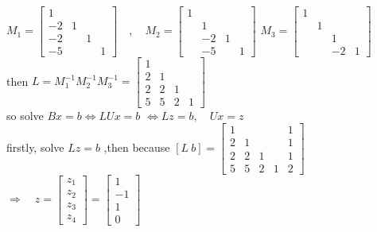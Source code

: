 \documentclass[english,onecolumn]{IEEEtran}
\begin{document}
\begin{enumerate}
\\$M_{1}=\left[\begin{array}{cccc}1 & & &\\ -2 & 1 && \\ -2 & & 1 & \\ -5 & & & 1\end{array}\right] \quad, \quad M_{2}=\left[\begin{array}{cccc}1 &&&\\ & 1&& \\ &-2 & 1& \\& -5 && 1\end{array}\right]$
$M_{3}=\left[\begin{array}{llll}1 & & &\\ & 1 & & \\ & & 1 & \\& & -2 & 1\end{array}\right]$
\\then $L=M_{1}^{-1} M_{2}^{-1} M_{3}^{-1}=\left[\begin{array}{llll}1 & & & \\ 2 & 1 & \\ 2 & 2 & 1 \\ 5 & 5 & 2 & 1\end{array}\right]$
\\so solve $B x=b \Leftrightarrow L U x=b$
$\Leftrightarrow L z=b, \quad U x=z$
\\firstly, solve $L z=b$ ,then because $[L\  b]=\left[\begin{array}{llll|l}1 & & & & 1 \\ 2 & 1 & & & 1 \\ 2 & 2 & 1 & & 1 \\ 5 & 5 & 2 & 1 & 2\end{array}\right]$
$\Rightarrow \quad z=\left[\begin{array}{l}z_{1} \\ z_{2} \\ z_{3} \\ z_{4}\end{array}\right]=\left[\begin{array}{l}1 \\ -1 \\ 1 \\ 0\end{array}\right]$

\end{enumerate}
\end{document}
